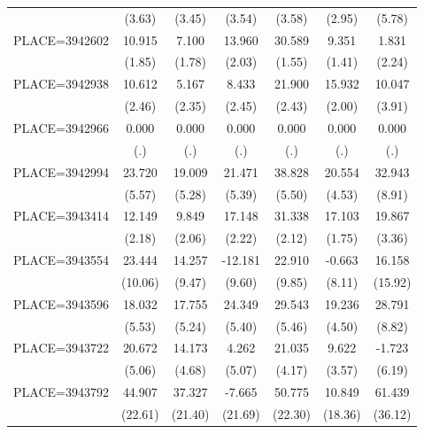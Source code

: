 {\begin{tabular}{l*{6}{c}}
                    &      (3.63)&      (3.45)&      (3.54)&      (3.58)&      (2.95)&      (5.78)\\
PLACE=3942602       &      10.915&       7.100&      13.960&      30.589&       9.351&       1.831\\
                    &      (1.85)&      (1.78)&      (2.03)&      (1.55)&      (1.41)&      (2.24)\\
PLACE=3942938       &      10.612&       5.167&       8.433&      21.900&      15.932&      10.047\\
                    &      (2.46)&      (2.35)&      (2.45)&      (2.43)&      (2.00)&      (3.91)\\
PLACE=3942966       &       0.000&       0.000&       0.000&       0.000&       0.000&       0.000\\
                    &         (.)&         (.)&         (.)&         (.)&         (.)&         (.)\\
PLACE=3942994       &      23.720&      19.009&      21.471&      38.828&      20.554&      32.943\\
                    &      (5.57)&      (5.28)&      (5.39)&      (5.50)&      (4.53)&      (8.91)\\
PLACE=3943414       &      12.149&       9.849&      17.148&      31.338&      17.103&      19.867\\
                    &      (2.18)&      (2.06)&      (2.22)&      (2.12)&      (1.75)&      (3.36)\\
PLACE=3943554       &      23.444&      14.257&     -12.181&      22.910&      -0.663&      16.158\\
                    &     (10.06)&      (9.47)&      (9.60)&      (9.85)&      (8.11)&     (15.92)\\
PLACE=3943596       &      18.032&      17.755&      24.349&      29.543&      19.236&      28.791\\
                    &      (5.53)&      (5.24)&      (5.40)&      (5.46)&      (4.50)&      (8.82)\\
PLACE=3943722       &      20.672&      14.173&       4.262&      21.035&       9.622&      -1.723\\
                    &      (5.06)&      (4.68)&      (5.07)&      (4.17)&      (3.57)&      (6.19)\\
PLACE=3943792       &      44.907&      37.327&      -7.665&      50.775&      10.849&      61.439\\
                    &     (22.61)&     (21.40)&     (21.69)&     (22.30)&     (18.36)&     (36.12)\\

\end{tabular}}
